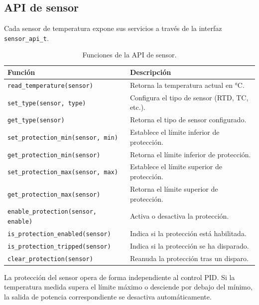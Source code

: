 \subsection{API de sensor}

Cada sensor de temperatura expone sus servicios a través de la interfaz
\texttt{sensor\_api\_t}.

\begin{table}[htbp]
    \centering
    \caption{Funciones de la API de sensor.}
    \label{tab:sensor-api}
    \begin{tabular}{ll}
        \toprule
        \textbf{Función} & \textbf{Descripción} \\
        \midrule
        \texttt{read\_temperature(sensor)} & Retorna la temperatura actual en °C. \\
        \texttt{set\_type(sensor, type)}   & Configura el tipo de sensor (RTD, TC, etc.). \\
        \texttt{get\_type(sensor)}         & Retorna el tipo de sensor configurado. \\
        \texttt{set\_protection\_min(sensor, min)} & Establece el límite inferior de protección. \\
        \texttt{get\_protection\_min(sensor)}      & Retorna el límite inferior de protección. \\
        \texttt{set\_protection\_max(sensor, max)} & Establece el límite superior de protección. \\
        \texttt{get\_protection\_max(sensor)}      & Retorna el límite superior de protección. \\
        \texttt{enable\_protection(sensor, enable)}& Activa o desactiva la protección. \\
        \texttt{is\_protection\_enabled(sensor)}   & Indica si la protección está habilitada. \\
        \texttt{is\_protection\_tripped(sensor)}   & Indica si la protección se ha disparado. \\
        \texttt{clear\_protection(sensor)}         & Reanuda la protección tras un disparo. \\
        \bottomrule
    \end{tabular}
\end{table}

La protección del sensor opera de forma independiente al control PID. Si la
temperatura medida supera el límite máximo o desciende por debajo del mínimo,
la salida de potencia correspondiente se desactiva automáticamente.

